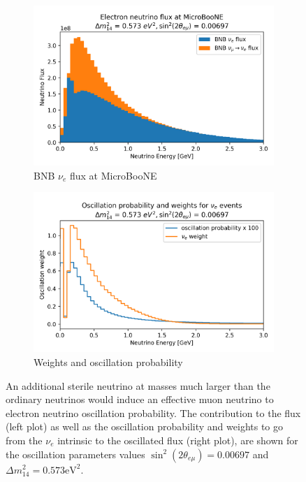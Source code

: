 \documentclass[a4paper]{article}
\newcommand{\nue}{$\nu_e$ }
\begin{document}
\begin{figure}[ht] 
\begin{center}
    \begin{subfigure}[b]{0.45\textwidth}
    \centering
    \includegraphics[width=1.00\textwidth]{Sensitivity/oscillation/osc_plot_deltam2_0573_sin2theta2_000697.png}
    \caption{BNB \nue flux at MicroBooNE}
    \end{subfigure}
    \begin{subfigure}[b]{0.45\textwidth}
    \centering
    \includegraphics[width=1.00\textwidth]{Sensitivity/oscillation/osc_plot_weights_deltam2_0573_sin2theta2_000697.png}
    \caption{Weights and oscillation probability}
    \end{subfigure}
\caption{An additional sterile neutrino at masses much larger than the ordinary neutrinos would induce an effective muon neutrino to electron neutrino oscillation probability.
The contribution to the flux (left plot) as well as the oscillation probability and weights to go from the \nue intrinsic to the oscillated flux (right plot), are shown for the oscillation parameters values $\sin^2(2\theta_{e \mu}) = 0.00697$ and $\Delta m_{14}^2 = 0.573 \text{eV}^2$.}
\label{fig:weights_oscillation_prob}
\end{center}
\end{figure}
\end{document}
